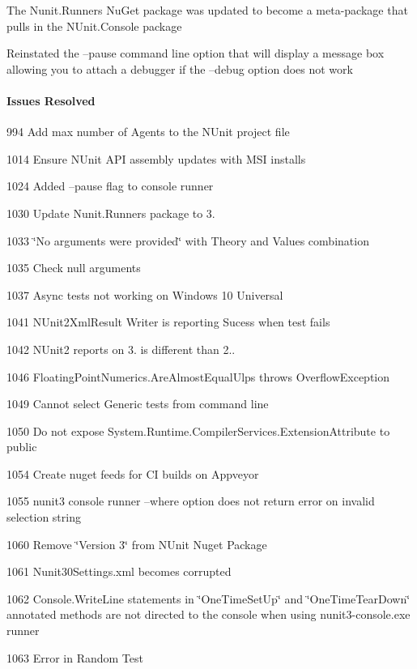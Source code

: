 \begin{DoxyItemize}
\item The Nunit.\+Runners Nu\+Get package was updated to become a meta-\/package that pulls in the N\+Unit.\+Console package
\item Reinstated the --pause command line option that will display a message box allowing you to attach a debugger if the --debug option does not work
\end{DoxyItemize}

\paragraph*{Issues Resolved}


\begin{DoxyItemize}
\item 994 Add max number of Agents to the N\+Unit project file
\item 1014 Ensure N\+Unit A\+PI assembly updates with M\+SI installs
\item 1024 Added --pause flag to console runner
\item 1030 Update Nunit.\+Runners package to 3.
\item 1033 \char`\"{}\+No arguments were provided\char`\"{} with Theory and Values combination
\item 1035 Check null arguments
\item 1037 Async tests not working on Windows 10 Universal
\item 1041 N\+Unit2\+Xml\+Result Writer is reporting Sucess when test fails
\item 1042 N\+Unit2 reports on 3. is different than 2..
\item 1046 Floating\+Point\+Numerics.\+Are\+Almost\+Equal\+Ulps throws Overflow\+Exception
\item 1049 Cannot select Generic tests from command line
\item 1050 Do not expose System.\+Runtime.\+Compiler\+Services.\+Extension\+Attribute to public
\item 1054 Create nuget feeds for CI builds on Appveyor
\item 1055 nunit3 console runner --where option does not return error on invalid selection string
\item 1060 Remove \char`\"{}\+Version 3\char`\"{} from N\+Unit Nuget Package
\item 1061 Nunit30\+Settings.\+xml becomes corrupted
\item 1062 Console.\+Write\+Line statements in \char`\"{}\+One\+Time\+Set\+Up\char`\"{} and \char`\"{}\+One\+Time\+Tear\+Down\char`\"{} annotated methods are not directed to the console when using nunit3-\/console.\+exe runner
\item 1063 Error in Random Test
\end{DoxyItemize}

